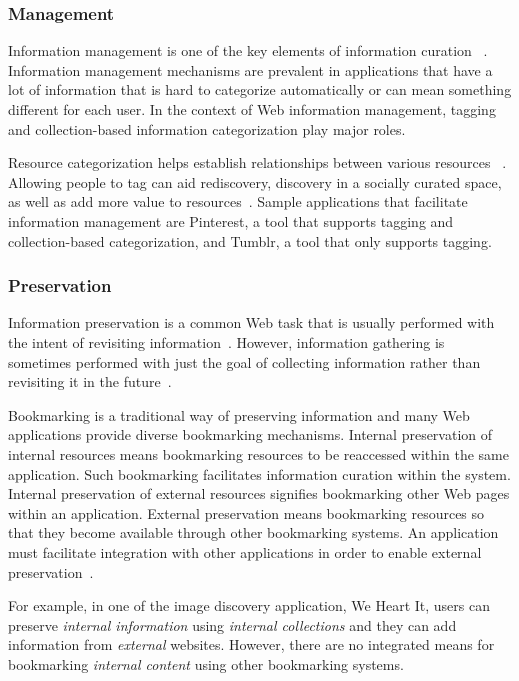 {{{\subsubsection{Management}
Information management is one of the key elements of information curation ~\cite{beagrie2008digital,whittaker2011personal}. Information management mechanisms are prevalent in applications that have a lot of information that is hard to categorize automatically or can mean something different for each user. In the context of Web information management, tagging and collection-based information categorization play major roles.

Resource categorization helps establish relationships between various resources ~\cite{beagrie2008digital,whittaker2011personal}. Allowing people to tag can aid rediscovery, discovery in a socially curated space, as well as add more value to resources~\cite{gruber2007ontology}. Sample applications that facilitate information management are Pinterest, a tool that supports tagging and collection-based categorization, and Tumblr, a tool that only supports tagging.

} %

{\subsubsection{Preservation}
Information preservation is a common Web task that is usually performed with the intent of revisiting information~\cite{abrams1998information,whittaker2011personal}. However, information gathering is sometimes performed with just the goal of collecting information rather than revisiting it in the future~\cite{lindley2012s}. 

Bookmarking is a traditional way of preserving information and many Web applications provide diverse bookmarking mechanisms. Internal preservation of internal resources means bookmarking resources to be reaccessed within the same application. Such bookmarking facilitates information curation within the system. Internal preservation of external resources signifies bookmarking other Web pages within an application. External preservation means bookmarking resources so that they become available through other bookmarking systems. An application must facilitate integration with other applications in order to enable external preservation~\cite{abrams1998information}.

For example, in one of the image discovery application, We Heart It, users can preserve \textit{internal  information} using \textit{internal collections} and they can add information from \textit{external} websites. However, there are no integrated means for bookmarking \textit{internal content} using other bookmarking systems.  
} %

}}
